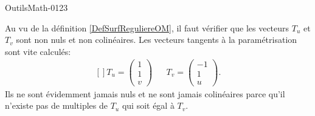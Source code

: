 
\begin{corrige}{OutilsMath-0123}

    Au vu de la définition \ref{DefSurfReguliereOM}, il faut vérifier que les vecteurs \( T_u\) et \( T_v\) sont non nuls et non colinéaires. Les vecteurs tangents à la paramétrisation sont vite calculés:
    \begin{equation}
        \begin{aligned}[]
            T_u=\begin{pmatrix}
                1    \\ 
                1    \\ 
                v    
            \end{pmatrix}&&T_v=\begin{pmatrix}
                -1    \\ 
                1    \\ 
                u    
            \end{pmatrix}.
        \end{aligned}
    \end{equation}
    Ils ne sont évidemment jamais nuls et ne sont jamais colinéaires parce qu'il n'existe pas de multiples de \( T_u\) qui soit égal à \( T_v\).


\end{corrige}
